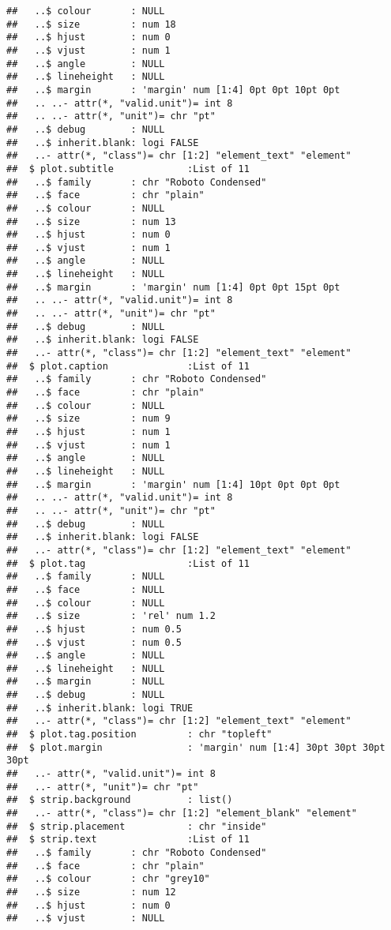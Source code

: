 \documentclass[
]{article}
\begin{document}
\begin{verbatim}
##   ..$ colour       : NULL
##   ..$ size         : num 18
##   ..$ hjust        : num 0
##   ..$ vjust        : num 1
##   ..$ angle        : NULL
##   ..$ lineheight   : NULL
##   ..$ margin       : 'margin' num [1:4] 0pt 0pt 10pt 0pt
##   .. ..- attr(*, "valid.unit")= int 8
##   .. ..- attr(*, "unit")= chr "pt"
##   ..$ debug        : NULL
##   ..$ inherit.blank: logi FALSE
##   ..- attr(*, "class")= chr [1:2] "element_text" "element"
##  $ plot.subtitle             :List of 11
##   ..$ family       : chr "Roboto Condensed"
##   ..$ face         : chr "plain"
##   ..$ colour       : NULL
##   ..$ size         : num 13
##   ..$ hjust        : num 0
##   ..$ vjust        : num 1
##   ..$ angle        : NULL
##   ..$ lineheight   : NULL
##   ..$ margin       : 'margin' num [1:4] 0pt 0pt 15pt 0pt
##   .. ..- attr(*, "valid.unit")= int 8
##   .. ..- attr(*, "unit")= chr "pt"
##   ..$ debug        : NULL
##   ..$ inherit.blank: logi FALSE
##   ..- attr(*, "class")= chr [1:2] "element_text" "element"
##  $ plot.caption              :List of 11
##   ..$ family       : chr "Roboto Condensed"
##   ..$ face         : chr "plain"
##   ..$ colour       : NULL
##   ..$ size         : num 9
##   ..$ hjust        : num 1
##   ..$ vjust        : num 1
##   ..$ angle        : NULL
##   ..$ lineheight   : NULL
##   ..$ margin       : 'margin' num [1:4] 10pt 0pt 0pt 0pt
##   .. ..- attr(*, "valid.unit")= int 8
##   .. ..- attr(*, "unit")= chr "pt"
##   ..$ debug        : NULL
##   ..$ inherit.blank: logi FALSE
##   ..- attr(*, "class")= chr [1:2] "element_text" "element"
##  $ plot.tag                  :List of 11
##   ..$ family       : NULL
##   ..$ face         : NULL
##   ..$ colour       : NULL
##   ..$ size         : 'rel' num 1.2
##   ..$ hjust        : num 0.5
##   ..$ vjust        : num 0.5
##   ..$ angle        : NULL
##   ..$ lineheight   : NULL
##   ..$ margin       : NULL
##   ..$ debug        : NULL
##   ..$ inherit.blank: logi TRUE
##   ..- attr(*, "class")= chr [1:2] "element_text" "element"
##  $ plot.tag.position         : chr "topleft"
##  $ plot.margin               : 'margin' num [1:4] 30pt 30pt 30pt 30pt
##   ..- attr(*, "valid.unit")= int 8
##   ..- attr(*, "unit")= chr "pt"
##  $ strip.background          : list()
##   ..- attr(*, "class")= chr [1:2] "element_blank" "element"
##  $ strip.placement           : chr "inside"
##  $ strip.text                :List of 11
##   ..$ family       : chr "Roboto Condensed"
##   ..$ face         : chr "plain"
##   ..$ colour       : chr "grey10"
##   ..$ size         : num 12
##   ..$ hjust        : num 0
##   ..$ vjust        : NULL

\end{verbatim}
\end{document}
